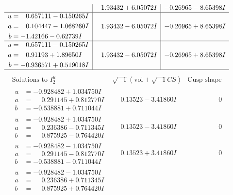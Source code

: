\documentclass[1p]{elsarticle_modified}
\theoremstyle{definition}
\newcommand{\I}{\sqrt{-1}}
\begin{document}
$$\begin{array}{c|c|c}
 & \phantom{-}1.93432 + 6.05072 I & -0.26965 - 8.65398 I \\ \hline\begin{aligned}
u &= \phantom{-}0.657111 - 0.150265 I \\
a &= \phantom{-}0.104447 - 1.068260 I \\
b &= -1.42166 - 0.62739 I\end{aligned}
 & \phantom{-}1.93432 - 6.05072 I & -0.26965 + 8.65398 I \\ \hline\begin{aligned}
u &= \phantom{-}0.657111 - 0.150265 I \\
a &= \phantom{-}0.91193 + 1.89650 I \\
b &= -0.936571 + 0.519018 I\end{aligned}
 & \phantom{-}1.93432 - 6.05072 I & -0.26965 + 8.65398 I\\
 \hline 
 \end{array}$$\newpage$$\begin{array}{c|c|c}  
\text{Solutions to }I^u_{2}& \I (\text{vol} + \sqrt{-1}CS) & \text{Cusp shape}\\
 \hline 
\begin{aligned}
u &= -0.928482 + 1.034750 I \\
a &= \phantom{-}0.291145 + 0.812770 I \\
b &= -0.538881 + 0.711044 I\end{aligned}
 & \phantom{-}0.13523 - 3.41860 I & \phantom{-0.000000 } 0 \\ \hline\begin{aligned}
u &= -0.928482 + 1.034750 I \\
a &= \phantom{-}0.236386 - 0.711345 I \\
b &= \phantom{-}0.875925 - 0.764420 I\end{aligned}
 & \phantom{-}0.13523 - 3.41860 I & \phantom{-0.000000 } 0 \\ \hline\begin{aligned}
u &= -0.928482 - 1.034750 I \\
a &= \phantom{-}0.291145 - 0.812770 I \\
b &= -0.538881 - 0.711044 I\end{aligned}
 & \phantom{-}0.13523 + 3.41860 I & \phantom{-0.000000 } 0 \\ \hline\begin{aligned}
u &= -0.928482 - 1.034750 I \\
a &= \phantom{-}0.236386 + 0.711345 I \\
b &= \phantom{-}0.875925 + 0.764420 I\end{aligned}

\end{array}$$
\end{document}
